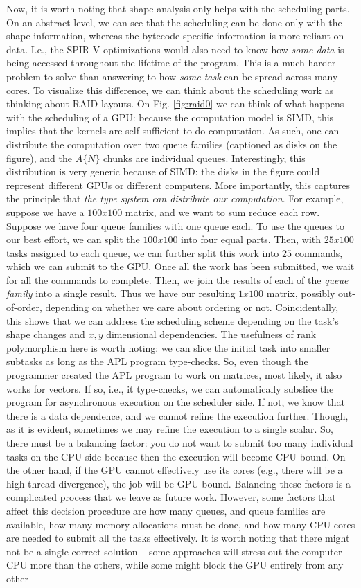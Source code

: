 \documentclass{report}
\begin{document}
Now, it is worth noting that shape analysis only helps with the scheduling parts. On an abstract level, we can see that the scheduling can be done only with the shape information, whereas the bytecode-specific information is more reliant on data. I.e., the SPIR-V optimizations would also need to know how \emph{some data} is being accessed throughout the lifetime of the program. This is a much harder problem to solve than answering to how \emph{some task} can be spread across many cores. To visualize this difference, we can think about the scheduling work as thinking about RAID layouts. On Fig. \ref{fig:raid0} we can think of what happens with the scheduling of a GPU: because the computation model is SIMD, this implies that the kernels are self-sufficient to do computation. As such, one can distribute the computation over two queue families (captioned as disks on the figure), and the $A\{N\}$ chunks are individual queues. Interestingly, this distribution is very generic because of SIMD: the disks in the figure could represent different GPUs or different computers. More importantly, this captures the principle that \emph{the type system can distribute our computation}. For example, suppose we have a $100x100$ matrix, and we want to sum reduce each row. Suppose we have four queue families with one queue each. To use the queues to our best effort, we can split the $100x100$ into four equal parts. Then, with $25x100$ tasks assigned to each queue, we can further split this work into $25$ commands, which we can submit to the GPU. Once all the work has been submitted, we wait for all the commands to complete. Then, we join the results of each of the \emph{queue family} into a single result. Thus we have our resulting $1x100$ matrix, possibly out-of-order, depending on whether we care about ordering or not. Coincidentally, this shows that we can address the scheduling scheme depending on the task's shape changes and $x,y$ dimensional dependencies. The usefulness of rank polymorphism here is worth noting: we can slice the initial task into smaller subtasks as long as the APL program type-checks. So, even though the programmer created the APL program to work on matrices, most likely, it also works for vectors. If so, i.e., it type-checks, we can automatically subslice the program for asynchronous execution on the scheduler side. If not, we know that there is a data dependence, and we cannot refine the execution further. Though, as it is evident, sometimes we may refine the execution to a single scalar. So, there must be a balancing factor: you do not want to submit too many individual tasks on the CPU side because then the execution will become CPU-bound. On the other hand, if the GPU cannot effectively use its cores (e.g., there will be a high thread-divergence), the job will be GPU-bound. Balancing these factors is a complicated process that we leave as future work. However, some factors that affect this decision procedure are how many queues, and queue families are available, how many memory allocations must be done, and how many CPU cores are needed to submit all the tasks effectively. It is worth noting that there might not be a single correct solution -- some approaches will stress out the computer CPU more than the others, while some might block the GPU entirely from any other 
\end{document}
